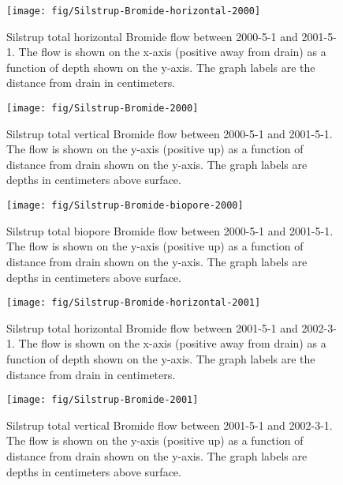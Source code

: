 \begin{figure}[htbp]
  \centering
  \texttt{[image: fig/Silstrup-Bromide-horizontal-2000]}
  
  \caption{Silstrup total horizontal Bromide flow between 2000-5-1 and
    2001-5-1.  The flow is shown on the x-axis (positive away from
    drain) as a function of depth shown on the y-axis.  The graph
    labels are the distance from drain in centimeters.}
  \label{fig:Silstrup-Bromide-2000-horizontal}
\end{figure}\FloatBarrier

\begin{figure}[htbp]
  \centering
  \texttt{[image: fig/Silstrup-Bromide-2000]}
  
  \caption{Silstrup total vertical Bromide flow between 2000-5-1 and
    2001-5-1.  The flow is shown on the y-axis (positive up) as a
    function of distance from drain shown on the y-axis.  The graph
    labels are depths in centimeters above surface.}
  \label{fig:Silstrup-Bromide-2000-vertical}
\end{figure}\FloatBarrier

\begin{figure}[htbp]
  \centering
  \texttt{[image: fig/Silstrup-Bromide-biopore-2000]}
  
  \caption{Silstrup total biopore Bromide flow between 2000-5-1 and
    2001-5-1.  The flow is shown on the y-axis (positive up) as a
    function of distance from drain shown on the y-axis.  The graph
    labels are depths in centimeters above surface.}
  \label{fig:Silstrup-Bromide-biopore-2000}
\end{figure}\FloatBarrier

\begin{figure}[htbp]
  \centering
  \texttt{[image: fig/Silstrup-Bromide-horizontal-2001]}
  
  \caption{Silstrup total horizontal Bromide flow between 2001-5-1 and
    2002-3-1.  The flow is shown on the x-axis (positive away from
    drain) as a function of depth shown on the y-axis.  The graph
    labels are the distance from drain in centimeters.}
  \label{fig:Silstrup-Bromide-2001-horizontal}
\end{figure}\FloatBarrier

\begin{figure}[htbp]
  \centering
  \texttt{[image: fig/Silstrup-Bromide-2001]}
  
  \caption{Silstrup total vertical Bromide flow between 2001-5-1 and
    2002-3-1.  The flow is shown on the y-axis (positive up) as a
    function of distance from drain shown on the y-axis.  The graph
    labels are depths in centimeters above surface.}
  \label{fig:Silstrup-Bromide-2001-vertical}
\end{figure}\FloatBarrier

